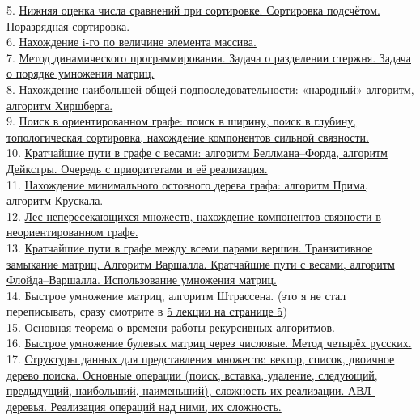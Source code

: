 \documentclass[a4paper]{article}
\theoremstyle{indented}
\theoremstyle{definition}
\theoremstyle{remark}
\begin{document}
5. \hyperlink{t2.5}{Нижняя оценка числа сравнений при сортировке. Сортировка подсчётом. Поразрядная сортировка.} \\ 

6. \hyperlink{t4}{Нахождение i-го по величине элемента массива.} \\ 

7. \hyperlink{e1}{Метод динамического программирования. Задача о разделении стержня. Задача о порядке умножения матриц.} \\ 

8. \hyperlink{d2}{Нахождение наибольшей общей подпоследовательности: «народный» алгоритм, алгоритм Хиршберга.} \\ 

9. \hyperlink{t10}{Поиск в ориентированном графе: поиск в ширину, поиск в глубину, топологическая сортировка, нахождение компонентов сильной связности.} \\ 

10. \hyperlink{t14}{Кратчайшие пути в графе с весами: алгоритм Беллмана–Форда, алгоритм Дейкстры. Очередь с приоритетами и её реализация.} \\ 

11. \hyperlink{t17}{Нахождение минимального остовного дерева графа: алгоритм Прима, алгоритм Крускала.} \\

12. \hyperlink{t20}{Лес непересекающихся множеств, нахождение компонентов связности в неориентированном графе.} \\ 

13. \hyperlink{t22}{Кратчайшие пути в графе между всеми парами вершин. Транзитивное замыкание матриц. Алгоритм Варшалла. Кратчайшие пути с весами, алгоритм Флойда–Варшалла. Использование умножения матриц.}  \\ 

14. Быстрое умножение матриц, алгоритм Штрассена. (это я не стал переписывать, сразу смотрите в \href{https://users.math-cs.spbu.ru/~okhotin/teaching/algorithms_2020/okhotin_algorithms_2020_l5.pdf}{5 лекции на странице 5})\\ 

15. \hyperlink{t25}{Основная теорема о времени работы рекурсивных алгоритмов.} \\ 

16. \hyperlink{e2}{Быстрое умножение булевых матриц через числовые. Метод четырёх русских.} \\ 

17. \hyperlink{d13}{Структуры данных для представления множеств: вектор, список, двоичное дерево поиска. Основные операции (поиск, вставка, удаление, следующий, предыдущий, наибольший, наименьший), сложность их реализации. АВЛ-деревья. Реализация операций над ними, их сложность.} \\ 
\end{document}
